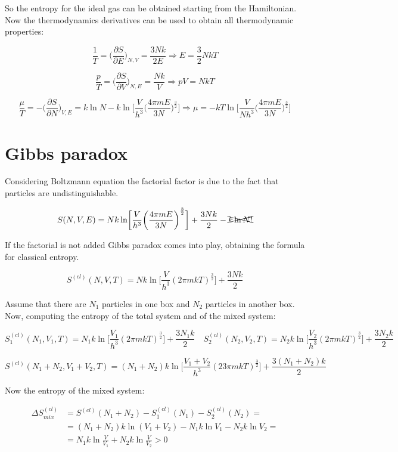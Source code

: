 	So the entropy for the ideal gas can be obtained starting from the Hamiltonian.
	Now the thermodynamics derivatives can be used to obtain all thermodynamic properties:

	$$\frac{1}{T} = \biggl(\frac{\partial S}{\partial E}\biggr)_{N, V} = \frac{3Nk}{2E}\Rightarrow E = \frac{3}{2}NkT$$

	$$\frac{p}{T} = \biggl(\frac{\partial S}{\partial V}\biggr)_{N, E} = \frac{Nk}{V}\Rightarrow pV = NkT$$

	$$\frac{\mu}{T} = -\biggl(\frac{\partial S}{\partial N}\biggr)_{V, E} = k\ln N-k\ln\biggl[\frac{V}{h^3}\biggl(\frac{4\pi mE}{3N}\biggr)^{\frac{3}{2}}\biggr] \Rightarrow \mu = -kT\ln\biggl[\frac{V}{Nh^3}\biggl(\frac{4\pi m E}{3N}\biggr)^{\frac{3}{2}}\biggr]$$

\section{Gibbs paradox}
Considering Boltzmann equation the factorial factor is due to the fact that particles are undistinguishable.

$$S(N, V, E) = Nk\ln\biggl[\frac{V}{h^3}\biggl(\frac{4\pi m E}{3N}\biggr)^{\frac{3}{2}}\biggr] + \frac{3Nk}{2} - \xcancel{k\ln N!}$$

If the factorial is not added Gibbs paradox comes into play, obtaining the formula for classical entropy.

$$S^{(cl)}(N, V, T) = Nk\ln\biggl[\frac{V}{h^3}(2\pi m k T)^{\frac{3}{2}}\biggr] + \frac{3Nk}{2}$$

Assume that there are $N_1$ particles in one box and $N_2$ particles in another box.
Now, computing the entropy of the total system and of the mixed system:

$$S_1^{(cl)}(N_1, V_1, T) = N_1k\ln\biggl[\frac{V_1}{h^3}(2\pi m k T)^{\frac{3}{2}}\biggr] + \frac{3N_1k}{2} \quad S_2^{(cl)}(N_2, V_2, T) = N_2k\ln\biggl[\frac{V_2}{h^3}(2\pi m k T)^{\frac{3}{2}}\biggr] + \frac{3N_2k}{2}$$

$$S^{(cl)}(N_1 + N_2, V_1+V_2, T) = (N_1 + N_2)k\ln\biggl[\frac{V_1+V_2}{h^3}(23\pi m k T)^{\frac{3}{2}}\biggr] + \frac{3(N_1+N_2)k}{2}$$

Now the entropy of the mixed system:

\begin{align*}
	\Delta S_{mix}^{(cl)} &= S^{(cl)}(N_1 + N_2) - S_1^{(cl)}(N_1) - S_2^{(cl)}(N_2) =\\
												&= (N_1 + N_2)k\ln(V_1+V_2) - N_1k\ln V_1- N_2k\ln V_2 = \\
												&= N_1 k\ln\frac{V}{V_1} + N_2k\ln\frac{V}{V_2}>0
\end{align*}

